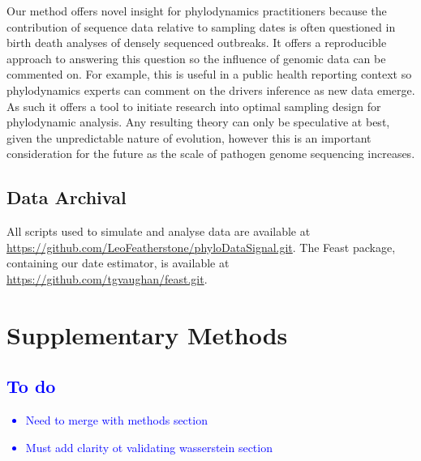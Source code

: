 \documentclass{article}
\begin{document}
Our method offers novel insight for phylodynamics practitioners because the contribution of sequence data relative to sampling dates is often questioned in birth death analyses of densely sequenced outbreaks. It offers a reproducible approach to answering this question so the influence of genomic data can be commented on. For example, this is useful in a public health reporting context so phylodynamics experts can comment on the drivers inference as new data emerge. As such it offers a tool to initiate research into optimal sampling design for phylodynamic analysis. Any resulting theory can only be speculative at best, given the unpredictable nature of evolution, however this is an important consideration for the future as the scale of pathogen genome sequencing increases.

\subsection*{Data Archival}
All scripts used to simulate and analyse data are available at \url{https://github.com/LeoFeatherstone/phyloDataSignal.git}. The Feast package, containing our date estimator, is available at \url{https://github.com/tgvaughan/feast.git}.
\section*{Supplementary Methods}
\textcolor{blue}{\subsection{To do}
    \begin{itemize}
        \item Need to merge with methods section
        \item Must add clarity ot validating wasserstein section
    \end{itemize}
    }
\end{document}
